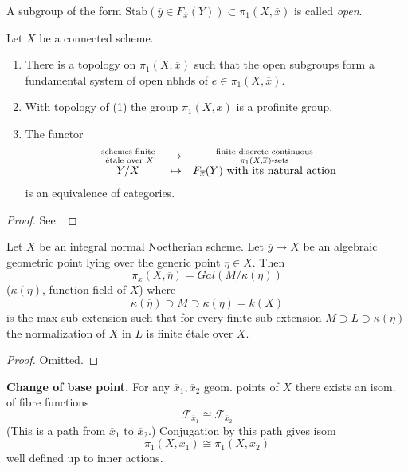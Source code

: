 \begin{definition}
\label{definition-open}
A subgroup of the form
$\text{Stab}(\overline y\in F_{\overline{x}}(Y))\subset \pi_1(X, \overline{x})$
is called {\it open}.
\end{definition}

\begin{theorem}[Grothendieck]
\label{theorem-fundamental-group}
Let $X$ be a connected scheme.
\begin{enumerate}
\item There is a topology on $\pi_1(X, \overline{x})$ such that the open
subgroups form a fundamental system of open nbhds of $e\in \pi_1(X, \overline
x)$.
\item With topology of (1) the group
$\pi_1(X, \overline{x})$ is a profinite group.
\item The functor
$$
\begin{matrix}
\text{ schemes finite } \atop \text{ \'etale over }X & \to &
\text{ finite discrete continuous } \atop \pi_1(X, \overline{x})\text{-sets}\\
Y / X& \mapsto & F_{\overline{x}}(Y) \text{ with its natural action}
\end{matrix}
$$
is an equivalence of categories.
\end{enumerate}
\end{theorem}

\begin{proof}
See \cite{SGA1}.
\end{proof}

\begin{proposition}
\label{proposition-integral-normal-fundamental-group}
Let $X$ be an integral normal Noetherian scheme. Let
$\overline y\to X$ be an algebraic geometric point lying
over the generic point $\eta\in X$. Then
$$
\pi_x(X, \overline \eta) = Gal(M/\kappa(\eta))
$$
($\kappa(\eta)$, function field of $X$) where
$$
\kappa(\overline \eta)\supset M\supset \kappa(\eta) = k(X)
$$
is the max sub-extension such that for every finite sub extension
$M\supset L\supset \kappa(\eta)$ the normalization of $X$ in $L$ is finite
\'etale over $X$.
\end{proposition}

\begin{proof}
Omitted.
\end{proof}

\noindent
{\bf Change of base point.} For any $\overline{x}_1, \overline{x}_2$
geom. points of $X$ there exists an isom. of fibre functions
$$
\mathcal{F}_{\overline{x}_1} \cong \mathcal{F}_{\overline{x}_2}
$$
(This is a path from $\overline{x}_1$ to $\overline{x}_2$.) Conjugation
by this path gives isom
$$
\pi_1(X, \overline{x}_1) \cong \pi_1(X, \overline{x}_2)
$$
well defined up to inner actions.

